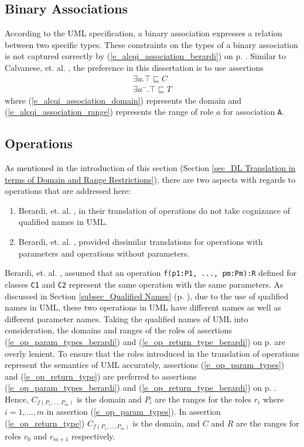 \subsection{Binary Associations} \label{sec_binary_associations_sroiq}
According to the UML specification, a binary association expresses a relation between two specific types.
These constraints on the types of a binary association is not captured correctly by 
(\ref{e_alcqi_association_berardi}) on p. \pageref{e_alcqi_association_berardi}.
Similar to Calvanese, et. al. \cite{Calvanese2009}, the preference in this dissertation is 
to use assertions
\begin{align}
     \exists a.\top \sqsubseteq C \label{e_alcqi_association_domain}\\
     \exists a^-.\top \sqsubseteq T \label{e_alcqi_association_range}
    \end{align} 
where (\ref{e_alcqi_association_domain}) represents the domain and 
(\ref{e_alcqi_association_range}) represents the range of role $a$ for association \texttt{A}.
    
\subsection{Operations}	\label{sec_operations_sroiq}
As mentioned in the introduction of this section 
(Section \ref{sec_DL Translation in terms of Domain and Range Restrictions}), 
there are two aspects with regards to operations that are addressed here:
\begin{enumerate}
 \item Berardi, et. al. \cite{Berardi2005}, in their translation of operations do not take
 cognizance of qualified names in UML.
 \item Berardi, et. al. \cite{Berardi2005}, provided dissimilar translations for operations with parameters
 and operations without parameters.
\end{enumerate}

Berardi, et. al. \cite{Berardi2005}, assumed that an operation \texttt{f(p1:P1, ..., pm:Pm):R}
 defined for classes \texttt{C1} and \texttt{C2} represent the same operation 
 with the same parameters. 
 As discussed in Section \ref{subsec_Qualified Names} (p. \pageref{subsec_Qualified Names}),
 due to the use of qualified names in UML, these
 two operations in UML have different names as well as different parameter names.
 Taking the qualified names of UML into consideration,
 the domains and ranges of the roles of assertions (\ref{e_op_param_types_berardi}) 
 and (\ref{e_op_return_type_berardi})
 on p. \pageref{e_op_param_types_berardi} are overly lenient. 
 To ensure that the roles introduced in the translation of operations represent 
 the semantics of UML accurately,
 assertions (\ref{e_op_param_types}) and (\ref{e_op_return_type}) are preferred to
 assertions (\ref{e_op_param_types_berardi})  and (\ref{e_op_return_type_berardi})
 on p. \pageref{e_op_param_types_berardi}.
  Hence, $C_{f(P_1, ..., P_m)}$ is the domain and $P_i$ are the ranges for 
  the roles $r_i$ where $i = 1, \ldots, m$ in assertion (\ref{e_op_param_types}).
  In assertion (\ref{e_op_return_type}) $C_{f(P_1, ..., P_m)}$ is the domain, 
  and $C$ and $R$ are the ranges for roles $r_0$ and
  $r_{m+1}$ respectively.

